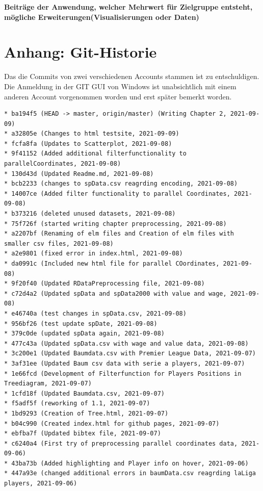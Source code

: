 \documentclass[usegeometry=true]{scrartcl}
\begin{document}
\textbf{Beiträge der Anwendung, welcher Mehrwert für Zielgruppe entsteht, mögliche Erweiterungen(Visualisierungen oder Daten)}

\newpage

\setcounter{page}{4}
\section*{Anhang: Git-Historie}
Das die Commits von zwei verschiedenen Accounts stammen ist zu entschuldigen. Die Anmeldung in der GIT GUI von Windows ist unabsichtlich mit einem anderen Account vorgenommen worden und erst später bemerkt worden.

\begin{verbatim}
* ba194f5 (HEAD -> master, origin/master) (Writing Chapter 2, 2021-09-09)
* a32805e (Changes to html testsite, 2021-09-09)
* fcfa8fa (Updates to Scatterplot, 2021-09-08)
* 9f41152 (Added additional filterfunctionality to parallelCoordinates, 2021-09-08)
* 130d43d (Updated Readme.md, 2021-09-08)
* bcb2233 (changes to spData.csv reagrding encoding, 2021-09-08)
* 14007ce (Added filter functionality to parallel Coordinates, 2021-09-08)
* b373216 (deleted unused datasets, 2021-09-08)
* 75f726f (started writing chapter preprocessing, 2021-09-08)
* a2207bf (Renaming of elm files and Creation of elm files with smaller csv files, 2021-09-08)
* a2e9801 (fixed error in index.html, 2021-09-08)
* da0991c (Included new html file for parallel COordinates, 2021-09-08)
* 9f20f40 (Updated RDataPreprocessing file, 2021-09-08)
* c72d4a2 (Updated spData and spData2000 with value and wage, 2021-09-08)
* e46740a (test changes in spData.csv, 2021-09-08)
* 956bf26 (test update spDate, 2021-09-08)
* 379c0de (updated spData again, 2021-09-08)
* 477c43a (Updated spData.csv with wage and value data, 2021-09-08)
* 3c200e1 (Updated Baumdata.csv with Premier League Data, 2021-09-07)
* 3af31ee (Updated Baum csv data with serie a players, 2021-09-07)
* 1e66fcd (Development of Filterfunction for Players Positions in Treediagram, 2021-09-07)
* 1cfd18f (Updated Baumdata.csv, 2021-09-07)
* f5adf5f (reworking of 1.1, 2021-09-07)
* 1bd9293 (Creation of Tree.html, 2021-09-07)
* b04c990 (Created index.html for github pages, 2021-09-07)
* ebfba7f (Updated bibtex file, 2021-09-07)
* c6240a4 (First try of preprocessing parallel coordinates data, 2021-09-06)
* 43ba73b (Added highlighting and Player info on hover, 2021-09-06)
* 447a93e (changed additional errors in baumData.csv reagrding laLiga players, 2021-09-06)

\end{verbatim}
\end{document}
